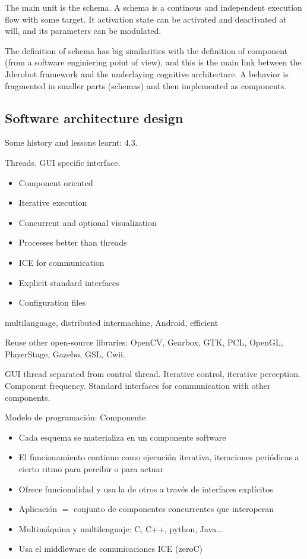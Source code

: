 \documentclass[twocolumn]{svjour3}          %
\begin{document}
The main unit is the schema. A schema is a continous and independent execution flow with some target. It activation state can be activated and deactivated at will, and its parameters can be modulated.

The definition of schema has big similarities with the definition of component (from a software enginiering point of view), and this is the main link between the Jderobot framework and the underlaying cognitive architecture. A behavior is fragmented in smaller parts (schemas) and then implemented as components.



\subsection{Software architecture design}

Some history and lessons learnt: 4.3. 

Threads. GUI specific interface. 

\begin{itemize}
\item Component oriented 
\item Iterative execution
\item Concurrent and optional visualization
\item Processes better than threads
\item ICE for communication
\item Explicit standard interfaces
\item Configuration files 
\end{itemize}

multilanguage, distributed intermachine, Android, efficient

Reuse other open-source libraries: OpenCV, Gearbox, GTK, PCL, OpenGL, PlayerStage, Gazebo, GSL, Cwii.


GUI thread separated from control thread.
Iterative control, iterative perception. Component frequency.
Standard interfaces for communication with other components.

Modelo de programación: Componente
\begin{itemize}
\item Cada esquema se materializa en un {componente} software 
\item El funcionamiento continuo como {ejecución iterativa}, iteraciones periódicas a cierto ritmo para percibir o para actuar
\item Ofrece funcionalidad y usa la de otros a través de {interfaces} explícitos
\item Aplicación $=$ conjunto de componentes concurrentes que interoperan
\item {Multimáquina} y {multilenguaje}: C, C++, python, Java... 
\item Usa el middleware de comunicaciones ICE (zeroC)
\end{itemize}
\end{document}
